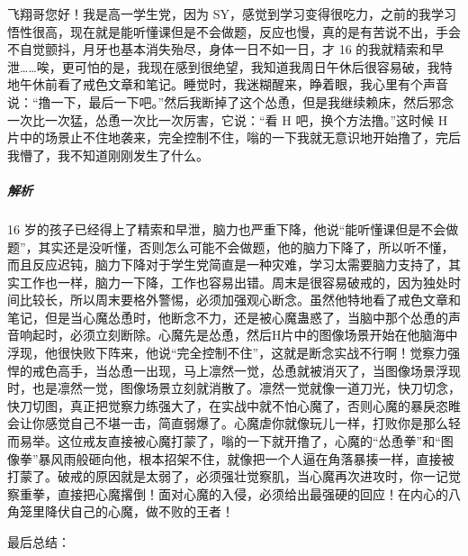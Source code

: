 \begin{case}
    飞翔哥您好！我是高一学生党，因为 SY，感觉到学习变得很吃力，之前的我学习悟性很高，现在就是能听懂课但是不会做题，反应也慢，真的是有苦说不出，手会不自觉颤抖，月牙也基本消失殆尽，身体一日不如一日，才 16 的我就精索和早泄……唉，更可怕的是，我现在感到很绝望，我知道我周日午休后很容易破，我特地午休前看了戒色文章和笔记。睡觉时，我迷糊醒来，睁着眼，我心里有个声音说：“撸一下，最后一下吧。”然后我断掉了这个怂恿，但是我继续赖床，然后邪念一次比一次猛，怂恿一次比一次厉害，它说：“看 H 吧，换个方法撸。”这时候 H 片中的场景止不住地袭来，完全控制不住，嗡的一下我就无意识地开始撸了，完后我懵了，我不知道刚刚发生了什么。
    \subparagraph{解析} 16 岁的孩子已经得上了精索和早泄，脑力也严重下降，他说“能听懂课但是不会做题”，其实还是没听懂，否则怎么可能不会做题，他的脑力下降了，所以听不懂，而且反应迟钝，脑力下降对于学生党简直是一种灾难，学习太需要脑力支持了，其实工作也一样，脑力一下降，工作也容易出错。周末是很容易破戒的，因为独处时间比较长，所以周末要格外警惕，必须加强观心断念。虽然他特地看了戒色文章和笔记，但是当心魔怂恿时，他断念不力，还是被心魔蛊惑了，当脑中那个怂恿的声音响起时，必须立刻断除。心魔先是怂恿，然后H片中的图像场景开始在他脑海中浮现，他很快败下阵来，他说“完全控制不住”，这就是断念实战不行啊！觉察力强悍的戒色高手，当怂恿一出现，马上凛然一觉，怂恿就被消灭了，当图像场景浮现时，也是凛然一觉，图像场景立刻就消散了。凛然一觉就像一道刀光，快刀切念，快刀切图，真正把觉察力练强大了，在实战中就不怕心魔了，否则心魔的暴戾恣睢会让你感觉自己不堪一击，简直弱爆了。心魔虐你就像玩儿一样，打败你是那么轻而易举。这位戒友直接被心魔打蒙了，嗡的一下就开撸了，心魔的“怂恿拳”和“图像拳”暴风雨般砸向他，根本招架不住，就像把一个人逼在角落暴揍一样，直接被打蒙了。破戒的原因就是太弱了，必须强壮觉察肌，当心魔再次进攻时，你一记觉察重拳，直接把心魔撂倒！面对心魔的入侵，必须给出最强硬的回应！在内心的八角笼里降伏自己的心魔，做不败的王者！
\end{case}

最后总结：

